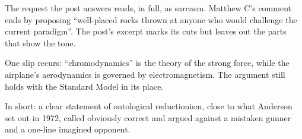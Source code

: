 \begin{afterword}
The request the post answers reads, in full, as sarcasm. Matthew C's comment ends by proposing ``well-placed rocks thrown at anyone who would challenge the current paradigm''. The post's excerpt marks its cuts but leaves out the parts that show the tone.

One slip recurs: ``chromodynamics'' is the theory of the strong force, while the airplane's aerodynamics is governed by electromagnetism. The argument still holds with the Standard Model in its place.

In short: a clear statement of ontological reductionism, close to what Anderson set out in 1972, called obviously correct and argued against a mistaken gunner and a one-line imagined opponent.
\end{afterword}
